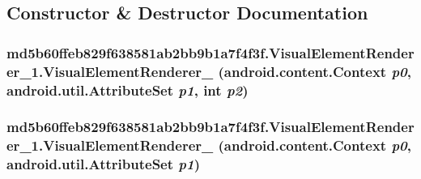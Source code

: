 \subsection{Constructor \& Destructor Documentation}
\hypertarget{classmd5b60ffeb829f638581ab2bb9b1a7f4f3f_1_1_visual_element_renderer__1_0cda467c85fce2d9022689cb94ec71d6}{
\subsubsection[{VisualElementRenderer\_\-1}]{\setlength{\rightskip}{0pt plus 5cm}md5b60ffeb829f638581ab2bb9b1a7f4f3f.VisualElementRenderer\_\-1.VisualElementRenderer\_ (android.content.Context {\em p0}, \/  android.util.AttributeSet {\em p1}, \/  int {\em p2})}}
\label{classmd5b60ffeb829f638581ab2bb9b1a7f4f3f_1_1_visual_element_renderer__1_0cda467c85fce2d9022689cb94ec71d6}


\hypertarget{classmd5b60ffeb829f638581ab2bb9b1a7f4f3f_1_1_visual_element_renderer__1_cec8fdec15887080a4ca53e275938cc9}{
\subsubsection[{VisualElementRenderer\_\-1}]{\setlength{\rightskip}{0pt plus 5cm}md5b60ffeb829f638581ab2bb9b1a7f4f3f.VisualElementRenderer\_\-1.VisualElementRenderer\_ (android.content.Context {\em p0}, \/  android.util.AttributeSet {\em p1})}}
\label{classmd5b60ffeb829f638581ab2bb9b1a7f4f3f_1_1_visual_element_renderer__1_cec8fdec15887080a4ca53e275938cc9}


